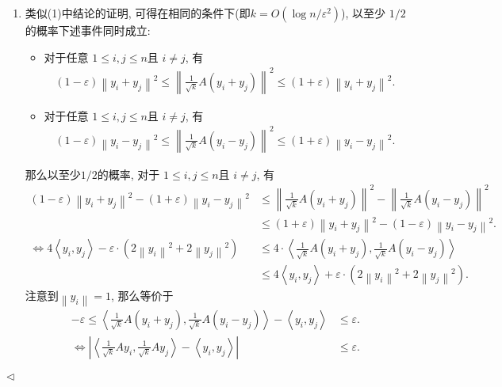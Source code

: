 \documentclass[11pt]{article}
\newenvironment{answer}[1][Solution]{\begin{trivlist}
    \item[\hskip \labelsep {\bfseries #1.}\hskip \labelsep]}{\hfill$\lhd$\end{trivlist}}
\newcommand\1{\mathds{1}}
\begin{document}
\begin{answer}
\begin{enumerate}[label=(\arabic*)]
        \item 类似(1)中结论的证明, 可得在相同的条件下(即$k=O(\log n/\varepsilon^2)$), 以至少 $1/2$ 的概率下述事件同时成立:
        \begin{itemize}
            \item 对于任意 $1\le i,j \le n$且 $i\neq j$, 有
            \begin{align}
                \label{eq:5.3}
                \left(1 - \varepsilon\right) \left\| y_i + y_j \right\|^2 \le \left\| \frac{1}{\sqrt{k}} A(y_i + y_j) \right\|^2 \le \left(1 + \varepsilon\right) \left\| y_i + y_j \right\|^2. 
            \end{align}
            \item 对于任意 $1\le i,j \le n$且 $i\neq j$, 有
            \begin{align}
                \label{eq:5.4}
                \left(1 - \varepsilon\right) \left\| y_i - y_j \right\|^2 \le \left\| \frac{1}{\sqrt{k}} A(y_i - y_j) \right\|^2 \le \left(1 + \varepsilon\right) \left\| y_i - y_j \right\|^2.
            \end{align}
        \end{itemize}
        那么以至少$1/2$的概率, 对于 $1\le i,j \le n$且 $i\neq j$, 有
        \begin{align*}
            \left(1-\varepsilon\right) \left\| y_i + y_j \right\|^2 - \left(1+\varepsilon\right) \left\| y_i - y_j \right\|^2 &\le \left\| \frac{1}{\sqrt{k}} A(y_i + y_j) \right\|^2 - \left\| \frac{1}{\sqrt{k}} A(y_i - y_j) \right\|^2 \\
            &\le \left(1+\varepsilon\right) \left\| y_i + y_j \right\|^2 - \left(1-\varepsilon\right) \left\| y_i - y_j \right\|^2. \\
            \iff 4\left\langle y_i, y_j \right\rangle - \varepsilon \cdot(2\left\|y_i\right\|^2 + 2\left\|y_j\right\|^2) &\le 4\cdot\left\langle \frac{1}{\sqrt{k}} A(y_i + y_j), \frac{1}{\sqrt{k}} A(y_i - y_j) \right\rangle \\ 
            &\le 4\left\langle y_i, y_j \right\rangle + \varepsilon \cdot(2\left\|y_i\right\|^2 + 2\left\|y_j\right\|^2).
        \end{align*}
        注意到$\left\|y_i\right\|=1$, 那么等价于
        \begin{align*}
            -\varepsilon \le \left\langle \frac{1}{\sqrt{k}} A(y_i + y_j), \frac{1}{\sqrt{k}} A(y_i - y_j) \right\rangle - \left\langle y_i, y_j \right\rangle &\le \varepsilon. \\
            \iff \left|\left\langle \frac{1}{\sqrt{k}}Ay_i, \frac{1}{\sqrt{k}}Ay_j \right\rangle - \left\langle y_i, y_j \right\rangle\right| &\le \varepsilon.

\end{align*}
\end{enumerate}
\end{answer}
\end{document}
